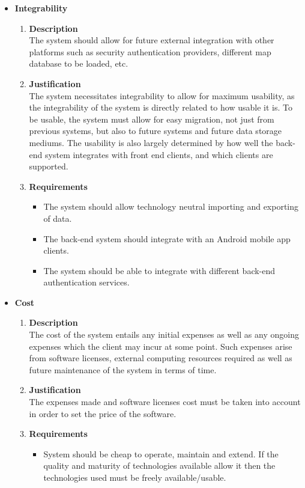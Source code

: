 \documentclass[a4paper,10pt]{article}
\begin{document}
\begin{itemize}
\item \textbf {Integrability}
\begin{enumerate}
\item \textbf{Description} \\
The system should allow for future external integration with other platforms such as security authentication providers, different map database to be loaded, etc.
\item \textbf{Justification} \\
The system necessitates integrability to allow for maximum usability, as the integrability of the system is directly related to how usable it is. To be usable, the system must allow for easy migration, not just from previous systems, but also to future systems and future data storage mediums. The usability is also largely determined by how well the back-end system integrates with front end clients, and which clients are supported.
\item \textbf{Requirements}
	\begin{itemize}
		\item The system should allow technology neutral importing and exporting of data.
		\item The back-end system should integrate with an Android mobile app clients.
		\item The system should be able to integrate with different back-end authentication services.
	\end{itemize}
\end{enumerate}
\item \textbf {Cost}
\begin{enumerate}
\item \textbf{Description} \\
The cost of the system entails any initial expenses as well as any ongoing expenses which the client may incur at some point. Such expenses arise from software licenses, external computing resources required as well as future maintenance of the system in terms of time.
\item \textbf{Justification} \\
The expenses made and software licenses cost must be taken into account in order to set the price of the software.
\item \textbf{Requirements}
	\begin{itemize}
		\item System should be cheap to operate, maintain and extend. If the quality and maturity of technologies available allow it then the technologies used must be freely available/usable.

\end{itemize}
\end{enumerate}
\end{itemize}
\end{document}
